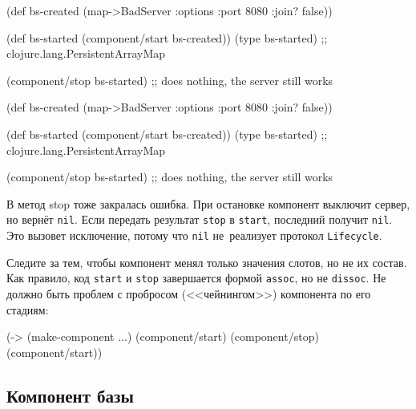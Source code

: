 \begin{english}
  \begin{clojure}
(def bs-created
  (map->BadServer
    {:options {:port 8080
               :join? false}}))

(def bs-started
   (component/start bs-created))
(type bs-started)
;; clojure.lang.PersistentArrayMap

(component/stop bs-started)
;; does nothing, the server still works
  \end{clojure}
\end{english}

\else

\begin{english}
  \begin{clojure}
(def bs-created (map->BadServer
                  {:options {:port 8080 :join? false}}))

(def bs-started (component/start bs-created))
(type bs-started)
;; clojure.lang.PersistentArrayMap

(component/stop bs-started)
;; does nothing, the server still works
  \end{clojure}
\end{english}

\fi

В метод stop тоже закралась ошибка. При остановке компонент выключит сервер, но
вернёт \verb|nil|. Если передать результат \verb|stop| в \verb|start|,
последний получит \verb|nil|. Это вызовет исключение, потому что \verb|nil|
не~реализует протокол \verb|Lifecycle|.


Следите за тем, чтобы компонент менял только значения слотов, но не их
состав. Как правило, код \verb|start| и \verb|stop| завершается формой
\verb|assoc|, но не \verb|dissoc|. Не должно быть проблем с пробросом
(<<чейнингом>>) компонента по его стадиям:

\begin{english}
  \begin{clojure}
(-> (make-component {...})
    (component/start)
    (component/stop)
    (component/start))
  \end{clojure}
\end{english}


\subsection{Компонент базы}

